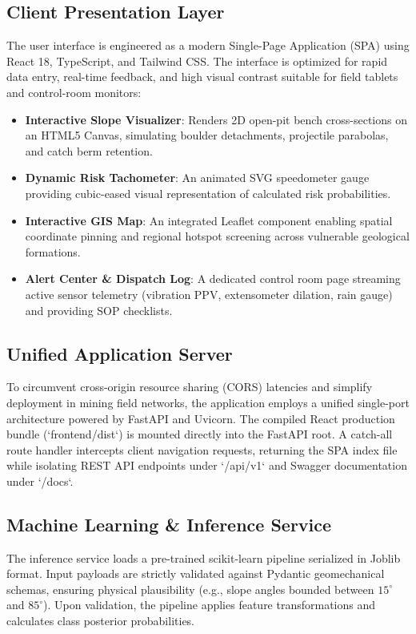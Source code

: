 \documentclass[conference]{IEEEtran}
\begin{document}
\subsection{Client Presentation Layer}
The user interface is engineered as a modern Single-Page Application (SPA) using React 18, TypeScript, and Tailwind CSS. The interface is optimized for rapid data entry, real-time feedback, and high visual contrast suitable for field tablets and control-room monitors:
\begin{itemize}
    \item \textbf{Interactive Slope Visualizer}: Renders 2D open-pit bench cross-sections on an HTML5 Canvas, simulating boulder detachments, projectile parabolas, and catch berm retention.
    \item \textbf{Dynamic Risk Tachometer}: An animated SVG speedometer gauge providing cubic-eased visual representation of calculated risk probabilities.
    \item \textbf{Interactive GIS Map}: An integrated Leaflet component enabling spatial coordinate pinning and regional hotspot screening across vulnerable geological formations.
    \item \textbf{Alert Center \& Dispatch Log}: A dedicated control room page streaming active sensor telemetry (vibration PPV, extensometer dilation, rain gauge) and providing SOP checklists.
\end{itemize}

\subsection{Unified Application Server}
To circumvent cross-origin resource sharing (CORS) latencies and simplify deployment in mining field networks, the application employs a unified single-port architecture powered by FastAPI and Uvicorn. The compiled React production bundle (`frontend/dist`) is mounted directly into the FastAPI root. A catch-all route handler intercepts client navigation requests, returning the SPA index file while isolating REST API endpoints under `/api/v1` and Swagger documentation under `/docs`.

\subsection{Machine Learning \& Inference Service}
The inference service loads a pre-trained scikit-learn pipeline serialized in Joblib format. Input payloads are strictly validated against Pydantic geomechanical schemas, ensuring physical plausibility (e.g., slope angles bounded between $15^\circ$ and $85^\circ$). Upon validation, the pipeline applies feature transformations and calculates class posterior probabilities.
\end{document}
